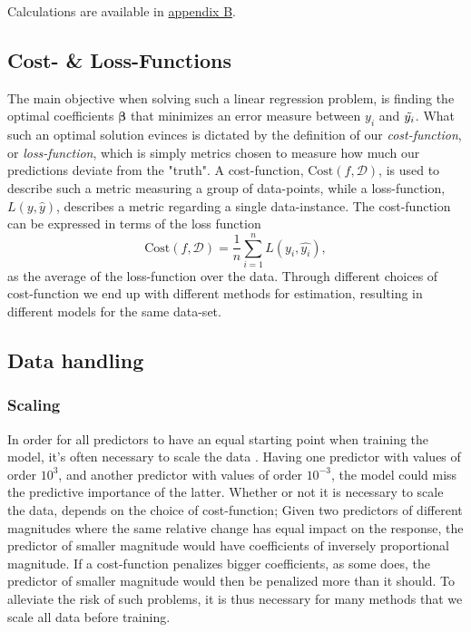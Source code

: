 Calculations are available in \hyperref[appendixB]{appendix B}.

\subsection{Cost- \& Loss-Functions}
The main objective when solving such a linear regression problem, is finding the optimal coefficients $\boldsymbol{\beta}$ that minimizes an error measure between $y_i$ and $\Tilde{y_i}$. 
What such an optimal solution evinces is dictated by the definition of our \textit{cost-function},  or \textit{loss-function}, which is simply metrics chosen to measure how much our predictions deviate from the "truth". 
A cost-function, $\text{Cost}(f,\mathcal{D} )$, is used to describe such a metric measuring a group of data-points, while a loss-function, $L(y, \hat{y})$, describes a metric regarding a single data-instance. 
The cost-function can be expressed in terms of the loss function
\begin{equation}
\text{Cost}(f,\mathcal{D}) = \frac{1}{n}\sum_{i=1}^n L(y_i, \hat{y_i}),
\end{equation}
as the average of the loss-function over the data. 
Through different choices of cost-function we end up with different methods for estimation, resulting in different models for the same data-set. 




\subsection{Data handling}

\subsubsection{Scaling}\label{scaling}

In order for all predictors to have an equal starting point when training the model, it's often necessary to scale the data \citep[p. 398]{hastie}. Having one predictor with values of order $10^3$, and another predictor with values of order $10^{-3}$, the model could miss the predictive importance of the latter. Whether or not it is necessary to scale the data, depends on the choice of cost-function; Given two predictors of different magnitudes where the same relative change has equal impact on the response, the predictor of smaller magnitude would have coefficients of inversely proportional magnitude. If a cost-function penalizes bigger coefficients, as some does, the predictor of smaller magnitude would then be penalized more than it should. To alleviate the risk of such problems, it is thus necessary for many methods that we scale all data before training. 

